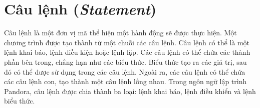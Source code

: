 \section{Câu lệnh (\textit{Statement})}

\regexstmt

Câu lệnh là một đơn vị mã thể hiện một hành động sẽ được thực hiện. Một chương trình được tạo thành từ một chuỗi các câu lệnh. Câu lệnh có thể là một lệnh khai báo, lệnh điều kiện hoặc lệnh lặp. Các câu lệnh có thể chứa các thành phần bên trong, chẳng hạn như các biểu thức. Biểu thức tạo ra các giá trị, sau đó có thể được sử dụng trong các câu lệnh. Ngoài ra, các câu lệnh có thể chứa các câu lệnh con, tạo thành một câu lệnh lồng nhau. Trong ngôn ngữ lập trình Pandora, câu lệnh được chia thành ba loại: lệnh khai báo, lệnh điều khiển và lệnh biểu thức.




